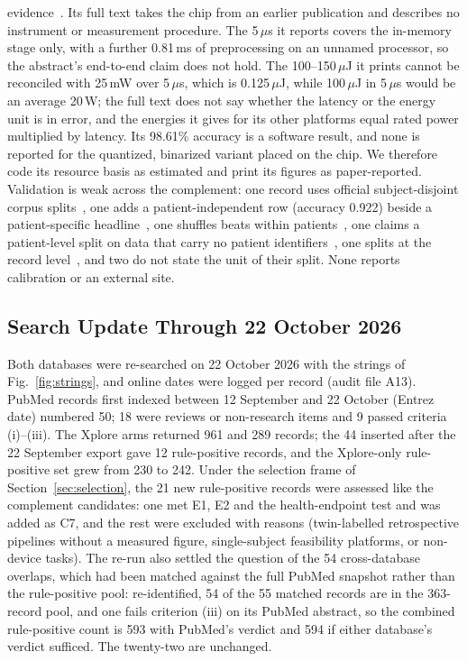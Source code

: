 \documentclass[journal]{IEEEtran}
\begin{document}
evidence~\cite{raghuraman2026cimecg}. Its full text takes the chip from an earlier publication and describes no instrument or measurement procedure. The 5\,$\mu$s it reports covers the in-memory stage only, with a further 0.81\,ms of preprocessing on an unnamed processor, so the abstract's end-to-end claim does not hold. The 100--150\,$\mu$J it prints cannot be reconciled with 25\,mW over 5\,$\mu$s, which is 0.125\,$\mu$J, while 100\,$\mu$J in 5\,$\mu$s would be an average 20\,W; the full text does not say whether the latency or the energy unit is in error, and the energies it gives for its other platforms equal rated power multiplied by latency. Its 98.61\% accuracy is a software result, and none is reported for the quantized, binarized variant placed on the chip. We therefore code its resource basis as estimated and print its figures as paper-reported. Validation is weak across the complement: one record uses official subject-disjoint corpus splits~\cite{kim2026cgmeeg}, one adds a patient-independent row (accuracy 0.922) beside a patient-specific headline~\cite{trabelsi2025kdepilepsy}, one shuffles beats within patients~\cite{raghuraman2026cimecg}, one claims a patient-level split on data that carry no patient identifiers~\cite{huynh2026afdetect}, one splits at the record level~\cite{wang2026timesight}, and two do not state the unit of their split. None reports calibration or an external site.

\subsection{Search Update Through 22 October 2026}
\label{sec:searchupdate}
Both databases were re-searched on 22 October 2026 with the strings of Fig.~\ref{fig:strings}, and online dates were logged per record (audit file A13). PubMed records first indexed between 12 September and 22 October (Entrez date) numbered 50; 18 were reviews or non-research items and 9 passed criteria (i)--(iii). The Xplore arms returned 961 and 289 records; the 44 inserted after the 22 September export gave 12 rule-positive records, and the Xplore-only rule-positive set grew from 230 to 242. Under the selection frame of Section~\ref{sec:selection}, the 21 new rule-positive records were assessed like the complement candidates: one met E1, E2 and the health-endpoint test and was added as C7, and the rest were excluded with reasons (twin-labelled retrospective pipelines without a measured figure, single-subject feasibility platforms, or non-device tasks). The re-run also settled the question of the 54 cross-database overlaps, which had been matched against the full PubMed snapshot rather than the rule-positive pool: re-identified, 54 of the 55 matched records are in the 363-record pool, and one fails criterion (iii) on its PubMed abstract, so the combined rule-positive count is 593 with PubMed's verdict and 594 if either database's verdict sufficed. The twenty-two are unchanged.
\end{document}
